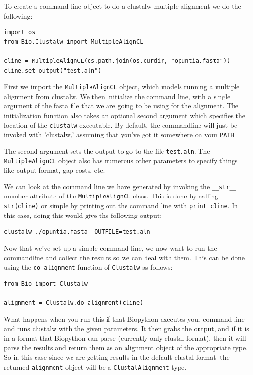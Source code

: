 \documentclass{report}
\begin{document}
To create a command line object to do a clustalw multiple alignment we do the following:

\begin{verbatim}
import os
from Bio.Clustalw import MultipleAlignCL

cline = MultipleAlignCL(os.path.join(os.curdir, "opuntia.fasta"))
cline.set_output("test.aln")
\end{verbatim}

First we import the \verb|MultipleAlignCL| object, which models running a multiple alignment from clustalw. We then initialize the command line, with a single argument of the fasta file that we are going to be using for the alignment. The initialization function also takes an optional second argument which specifies the location of the \verb|clustalw| executable. By default, the commandline will just be invoked with 'clustalw,' assuming that you've got it somewhere on your \verb|PATH|.


The second argument sets the output to go to the file \verb|test.aln|. The \verb|MultipleAlignCL| object also has numerous other parameters to specify things like output format, gap costs, etc. 


We can look at the command line we have generated by invoking the \verb|__str__| member attribute of the \verb|MultipleAlignCL| class. This is done by calling \verb|str(cline)| or simple by printing out the command line with \verb|print cline|. In this case, doing this would give the following output:

\begin{verbatim}
clustalw ./opuntia.fasta -OUTFILE=test.aln
\end{verbatim}

Now that we've set up a simple command line, we now want to run the commandline and collect the results so we can deal with them. This can be done using the \verb|do_alignment| function of \verb|Clustalw| as follows:

\begin{verbatim}
from Bio import Clustalw

alignment = Clustalw.do_alignment(cline)
\end{verbatim}

What happens when you run this if that Biopython executes your command line and runs clustalw with the given parameters. It then grabs the output, and if it is in a format that Biopython can parse (currently only clustal format), then it will parse the results and return them as an alignment object of the appropriate type. So in this case since we are getting results in the default clustal format, the returned \verb|alignment| object will be a \verb|ClustalAlignment| type.
\end{document}
